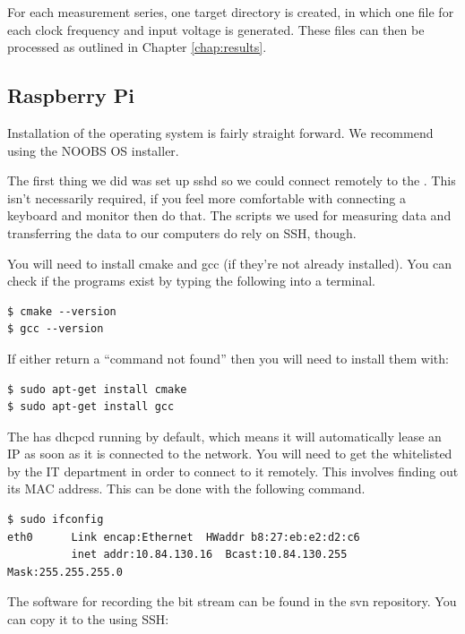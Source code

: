 For each  measurement series, one  target directory  is created, in  which one
file for each clock frequency and  input voltage is generated. These files can
then be processed as outlined in Chapter \ref{chap:results}.


\subsection{Raspberry Pi}
\label{subsec:raspi}

Installation of the operating system  is fairly straight forward. We recommend
using the NOOBS\cite{ref:raspi} OS installer.

The first thing we did was set up sshd  so  we  could  connect remotely to the
\raspi. This isn't necessarily required, if you  feel  more  comfortable  with
connecting  a  keyboard  and  monitor  then  do that. The scripts we used  for
measuring data and  transferring  the  data  to  our computers do rely on SSH,
though.

You will need to install cmake and gcc (if they're not already installed). You
can check if the programs exist by typing the following into a terminal.

\begin{verbatim}
$ cmake --version
$ gcc --version
\end{verbatim}

If either return a ``command not found''  then  you  will need to install them
with:
\begin{verbatim}
$ sudo apt-get install cmake
$ sudo apt-get install gcc
\end{verbatim}

The \raspi has dhcpcd running by default, which means  it  will  automatically
lease an IP as soon  as  it  is connected to the network. You will need to get
the \raspi whitelisted  by  the  IT  department  in  order  to  connect  to it
remotely. This involves finding out its MAC address. This can be done with the
following command.

\begin{verbatim}
$ sudo ifconfig
eth0      Link encap:Ethernet  HWaddr b8:27:eb:e2:d2:c6  
          inet addr:10.84.130.16  Bcast:10.84.130.255  Mask:255.255.255.0
\end{verbatim}

The software for recording the bit stream can be found in  the svn repository.
You can copy it to the \raspi using SSH:

